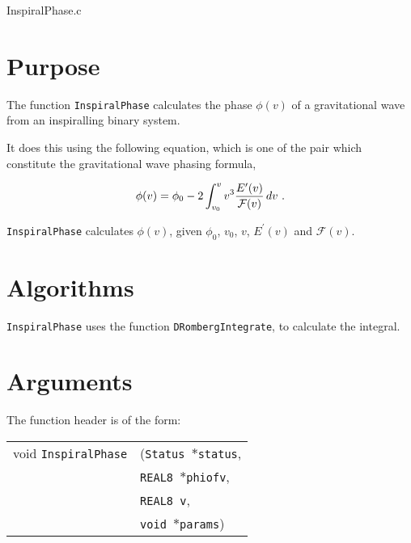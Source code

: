 \documentclass[12pt]{article}
\begin{document}
\huge
\begin{center}
InspiralPhase.c
\end{center}
\normalsize
\vspace{10mm}

\section{Purpose}

The function \texttt{InspiralPhase} calculates the phase $\phi(v)$ of a gravitational wave from an inspiralling binary system.

It does this using the following equation, which is one of the pair which constitute the gravitational wave phasing formula,

\begin{equation}
\phi(v) =  \phi_{0} - 2 \int_{v_{0}}^{v} v^{3} \frac{E'(v)}{{\cal F}(v)} \, dv \,\,.
\label{phiofv}
\end{equation}

\texttt{InspiralPhase} calculates $\phi(v)$, given $\phi_{0}$, $v_{0}$,  $v$, $E^{\prime}(v)$ and $\mathcal{F}(v)$.




\section{Algorithms}

\texttt{InspiralPhase} uses the function \texttt{DRombergIntegrate}, to calculate the integral.


\section{Arguments}

The function header is of the form:

\vspace{5mm}

\begin{tabular}{ll}
void \texttt{InspiralPhase}&(\texttt{Status $\ast$status},     \\
                                   &\texttt{REAL8 $\ast$phiofv}, \\
                                   &\texttt{REAL8 v}, \\
                                   &\texttt{void $\ast$params})
\end{tabular}

\vspace{5mm}
\end{document}

